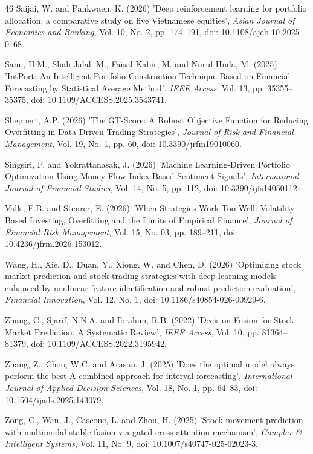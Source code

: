\begin{thebibliography}{46}
Saijai, W. and Pankwaen, K. (2026) 'Deep reinforcement learning for portfolio allocation: a comparative study on five Vietnamese equities', {\it Asian Journal of Economics and Banking}, Vol. 10, No. 2, pp. 174--191, doi: 10.1108/ajeb-10-2025-0168.

Sami, H.M., Shah Jalal, M., Faisal Kabir, M. and Nurul Huda, M. (2025) 'IntPort: An Intelligent Portfolio Construction Technique Based on Financial Forecasting by Statistical Average Method', {\it IEEE Access}, Vol. 13, pp. 35355--35375, doi: 10.1109/ACCESS.2025.3543741.

Sheppert, A.P. (2026) 'The GT-Score: A Robust Objective Function for Reducing Overfitting in Data-Driven Trading Strategies', {\it Journal of Risk and Financial Management}, Vol. 19, No. 1, pp. 60, doi: 10.3390/jrfm19010060.

Singsiri, P. and Yokrattanasak, J. (2026) 'Machine Learning-Driven Portfolio Optimization Using Money Flow Index-Based Sentiment Signals', {\it International Journal of Financial Studies}, Vol. 14, No. 5, pp. 112, doi: 10.3390/ijfs14050112.

Valls, F.B. and Steurer, E. (2026) 'When Strategies Work Too Well: Volatility-Based Investing, Overfitting and the Limits of Empirical Finance', {\it Journal of Financial Risk Management}, Vol. 15, No. 03, pp. 189--211, doi: 10.4236/jfrm.2026.153012.

Wang, H., Xie, D., Duan, Y., Xiong, W. and Chen, D. (2026) 'Optimizing stock market prediction and stock trading strategies with deep learning models enhanced by nonlinear feature identification and robust prediction evaluation', {\it Financial Innovation}, Vol. 12, No. 1, doi: 10.1186/s40854-026-00929-6.

Zhang, C., Sjarif, N.N.A. and Ibrahim, R.B. (2022) 'Decision Fusion for Stock Market Prediction: A Systematic Review', {\it IEEE Access}, Vol. 10, pp. 81364--81379, doi: 10.1109/ACCESS.2022.3195942.

Zhang, Z., Choo, W.C. and Arasan, J. (2025) 'Does the optimal model always perform the best A combined approach for interval forecasting', {\it International Journal of Applied Decision Sciences}, Vol. 18, No. 1, pp. 64--83, doi: 10.1504/ijads.2025.143079.

Zong, C., Wan, J., Cascone, L. and Zhou, H. (2025) 'Stock movement prediction with multimodal stable fusion via gated cross-attention mechanism', {\it Complex \& Intelligent Systems}, Vol. 11, No. 9, doi: 10.1007/s40747-025-02023-3.

\end{thebibliography}
